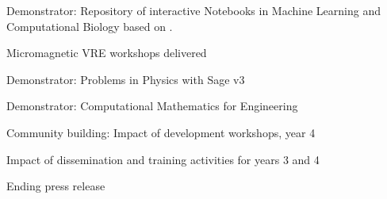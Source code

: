 \begin{workpackage}
\begin{wpdelivs}
 \begin{wpdeliv}[due=44,miles=eval,id=notebook-repo,dissem=PU,nature=DEM,lead=USH]{Demonstrator: Repository of interactive Notebooks in Machine Learning and Computational Biology based on \TheProject.}\end{wpdeliv}
 \begin{wpdeliv}[due=44,miles=eval,id=oommfnb-workshops,dissem=PU,nature=OTHER,lead=USO]{Micromagnetic
     VRE workshops delivered} \end{wpdeliv}
 \begin{wpdeliv}[due=47,miles=eval,id=ibook3c,dissem=PU,nature=DEM,lead=US]{Demonstrator: Problems in Physics with Sage v3} \end{wpdeliv}
  \begin{wpdeliv}[due=47,miles=eval,id=ibook4,dissem=PU,nature=DEM,lead=USO]{Demonstrator:
      Computational Mathematics for Engineering} \end{wpdeliv}
 \begin{wpdeliv}[due=48,miles=eval,id=workshops-4,dissem=PU,nature=R,lead=PS]{Community building: Impact of development workshops, year 4}\end{wpdeliv}
 \begin{wpdeliv}[due=48,id=dissem-2,dissem=PU,nature=R,lead=PS]{Impact of dissemination and training activities for years 3 and 4}\end{wpdeliv}
\begin{wpdeliv}[due=48,miles=eval,id=press-release-2,dissem=PU,nature=DEC,lead=PS]{Ending press release}\end{wpdeliv}
\end{wpdelivs}
\end{workpackage}


